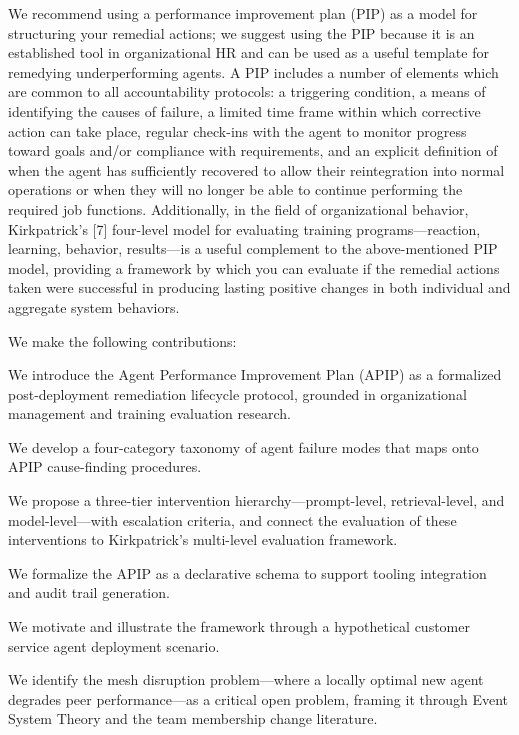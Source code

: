 We recommend using a performance improvement plan (PIP) as a model for structuring your remedial actions; we suggest using the PIP because it is an established tool in organizational HR and can be used as a useful template for remedying underperforming agents. A PIP includes a number of elements which are common to all accountability protocols: a triggering condition, a means of identifying the causes of failure, a limited time frame within which corrective action can take place, regular check-ins with the agent to monitor progress toward goals and/or compliance with requirements, and an explicit definition of when the agent has sufficiently recovered to allow their reintegration into normal operations or when they will no longer be able to continue performing the required job functions. Additionally, in the field of organizational behavior, Kirkpatrick's [7] four-level model for evaluating training programs---reaction, learning, behavior, results---is a useful complement to the above-mentioned PIP model, providing a framework by which you can evaluate if the remedial actions taken were successful in producing lasting positive changes in both individual and aggregate system behaviors.

We make the following contributions:

We introduce the Agent Performance Improvement Plan (APIP) as a formalized post-deployment remediation lifecycle protocol, grounded in organizational management and training evaluation research.

We develop a four-category taxonomy of agent failure modes that maps onto APIP cause-finding procedures.

We propose a three-tier intervention hierarchy---prompt-level, retrieval-level, and model-level---with escalation criteria, and connect the evaluation of these interventions to Kirkpatrick's multi-level evaluation framework.

We formalize the APIP as a declarative schema to support tooling integration and audit trail generation.

We motivate and illustrate the framework through a hypothetical customer service agent deployment scenario.

We identify the mesh disruption problem---where a locally optimal new agent degrades peer performance---as a critical open problem, framing it through Event System Theory and the team membership change literature.

